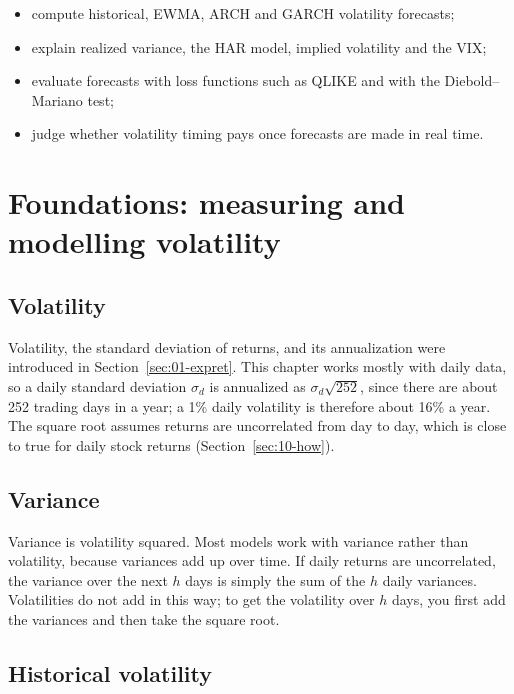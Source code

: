 \begin{itemize}[nosep]
  \item compute historical, EWMA, ARCH and GARCH volatility forecasts;
  \item explain realized variance, the HAR model, implied volatility and the VIX;
  \item evaluate forecasts with loss functions such as QLIKE and with the Diebold--Mariano test;
  \item judge whether volatility timing pays once forecasts are made in real time.
\end{itemize}


\section{Foundations: measuring and modelling volatility}
\label{sec:10-foundations}

\subsection{Volatility}

Volatility, the standard deviation of returns, and its annualization were introduced in Section~\ref{sec:01-expret}. This chapter works mostly with daily data, so a daily standard deviation $\sigma_d$ is annualized as $\sigma_d\sqrt{252}$, since there are about 252 trading days in a year; a 1\% daily volatility is therefore about 16\% a year. 
The square root assumes returns are uncorrelated from day to day, which is close to true for daily stock returns (Section~\ref{sec:10-how}). 

\subsection{Variance}

Variance is volatility squared. 
Most models work with variance rather than volatility, because variances add up over time. If daily returns are uncorrelated, the variance over the next $h$ days is simply the sum of the $h$ daily variances. Volatilities do not add in this way; to get the volatility over $h$ days, you first add the variances and then take the square root.


\subsection{Historical volatility}

